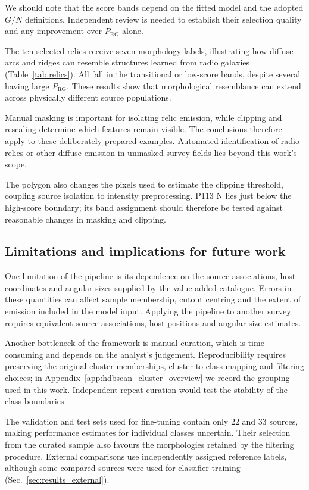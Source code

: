 We should note that the score bands depend on the fitted model and the adopted \(G/N\) definitions. Independent review is needed to establish their selection quality and any improvement over \(P_\mathrm{RG}\) alone.

The ten selected relics receive seven morphology labels, illustrating how diffuse arcs and ridges can resemble structures learned from radio galaxies (Table~\ref{tab:relics}). All fall in the transitional or low-score bands, despite several having large \(P_\mathrm{RG}\). These results show that morphological resemblance can extend across physically different source populations.

Manual masking is important for isolating relic emission, while clipping and rescaling determine which features remain visible. The conclusions therefore apply to these deliberately prepared examples. Automated identification of radio relics or other diffuse emission in unmasked survey fields lies beyond this work's scope.

The polygon also changes the pixels used to estimate the clipping threshold, coupling source isolation to intensity preprocessing. P113 N lies just below the high-score boundary; its band assignment should therefore be tested against reasonable changes in masking and clipping.

\subsection{Limitations and implications for future work}
\label{sec:discussion_validation}

One limitation of the pipeline is its dependence on the source associations, host coordinates and angular sizes supplied by the value-added catalogue.
Errors in these quantities can affect sample membership, cutout centring and the extent of emission included in the model input.
Applying the pipeline to another survey requires equivalent source associations, host positions and angular-size estimates.

Another bottleneck of the framework is manual curation, which is time-consuming and depends on the analyst's judgement.
Reproducibility requires preserving the original cluster memberships, cluster-to-class mapping and filtering choices; in Appendix~\ref{app:hdbscan_cluster_overview} we record the grouping used in this work. Independent repeat curation would test the stability of the class boundaries.

The validation and test sets used for fine-tuning contain only \(22\) and \(33\) sources, making performance estimates for individual classes uncertain.
Their selection from the curated sample also favours the morphologies retained by the filtering procedure.
External comparisons use independently assigned reference labels, although some compared sources were used for classifier training (Sec.~\ref{sec:results_external}).

